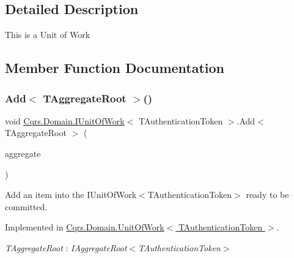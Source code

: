 \subsection{Detailed Description}
This is a Unit of Work 



\subsection{Member Function Documentation}
\mbox{\label{interfaceCqrs_1_1Domain_1_1IUnitOfWork_a786ebca85b4ef7294b98280230ef1397_a786ebca85b4ef7294b98280230ef1397}} 
\subsubsection{\texorpdfstring{Add$<$ T\+Aggregate\+Root $>$()}{Add< TAggregateRoot >()}}
{\footnotesize\ttfamily void \hyperlink{interfaceCqrs_1_1Domain_1_1IUnitOfWork}{Cqrs.\+Domain.\+I\+Unit\+Of\+Work}$<$ T\+Authentication\+Token $>$.Add$<$ T\+Aggregate\+Root $>$ (\begin{DoxyParamCaption}\item[{T\+Aggregate\+Root}]{aggregate }\end{DoxyParamCaption})}



Add an item into the I\+Unit\+Of\+Work$<$\+T\+Authentication\+Token$>$ ready to be committed. 



Implemented in \hyperlink{classCqrs_1_1Domain_1_1UnitOfWork_a840214f97d3661c7b5a739df65fadc9f_a840214f97d3661c7b5a739df65fadc9f}{Cqrs.\+Domain.\+Unit\+Of\+Work$<$ T\+Authentication\+Token $>$}.

\begin{Desc}
\item[Type Constraints]\begin{description}
\item[{\em T\+Aggregate\+Root} : {\em I\+Aggregate\+Root$<$T\+Authentication\+Token$>$}]\end{description}
\end{Desc}
\mbox{\label{interfaceCqrs_1_1Domain_1_1IUnitOfWork_ade600c9bf9e8380c24eaf1e7e0df6e01_ade600c9bf9e8380c24eaf1e7e0df6e01}} 

